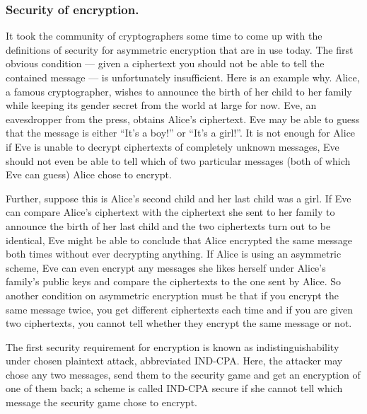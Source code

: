 \documentclass{llncs}
\begin{document}
\subsubsection{Security of encryption.}
It took the community of cryptographers some time to come up with the definitions
of security for asymmetric encryption that are in use today. The first obvious condition --- given a ciphertext you should not be able to tell the contained message --- is unfortunately insufficient. Here is an example why.
Alice, a famous cryptographer, wishes to announce the birth of her child to her family while keeping its gender secret from the world at large for now. Eve, an eavesdropper from the press, obtains Alice's ciphertext. Eve may be able to guess that the message is either ``It's a boy!'' or ``It's a girl!''. It is not enough for Alice if Eve is unable to decrypt ciphertexts of completely unknown messages, Eve should not even be able to tell which of two particular messages (both of which Eve can guess) Alice chose to encrypt.

Further, suppose this is Alice's second child and her last child was a girl. If Eve can compare Alice's ciphertext with the ciphertext she sent to her family to announce the birth of her last child and the two ciphertexts turn out to be identical, Eve might be able to conclude that Alice encrypted the same message both times without ever decrypting anything. If Alice is using an asymmetric scheme, Eve can even encrypt any messages she likes herself under Alice's family's public keys and compare the ciphertexts to the one sent by Alice. So another condition on asymmetric encryption must be that if you encrypt the same message twice, you get different ciphertexts each time and if you are given two ciphertexts, you cannot tell whether they encrypt the same message or not.

The first security requirement for encryption is known as indistinguishability
under chosen plaintext attack, abbreviated IND-CPA. Here, the attacker may chose
any two messages, send them to the security game and get an encryption of one of
them back; a scheme is called IND-CPA secure if she cannot tell which message
the security game chose to encrypt.
\end{document}
